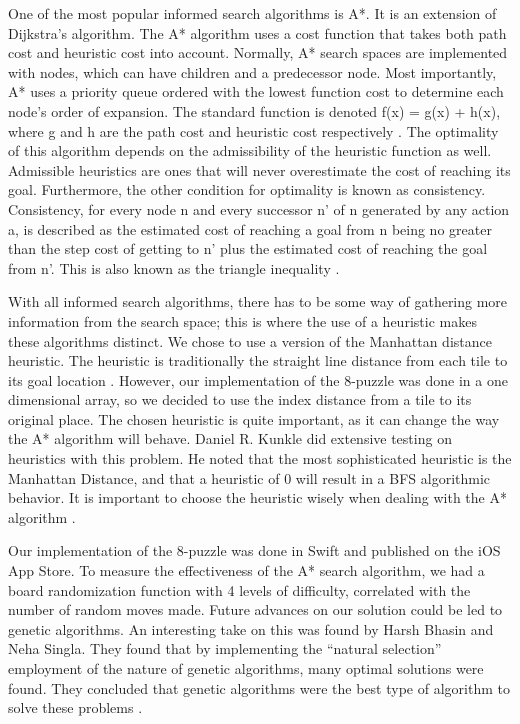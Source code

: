 \documentclass{article}
\begin{document}
One of the most popular informed search algorithms is A*. It is an extension of Dijkstra's algorithm. The A* algorithm uses a cost function that takes both path cost and heuristic cost into account. Normally, A* search spaces are implemented with nodes, which can have children and a predecessor node. Most importantly, A* uses a priority queue ordered with the lowest function cost to determine each node's order of expansion. The standard function is denoted f(x) = g(x) + h(x), where g and h are the path cost and heuristic cost respectively \cite{nosrati2012investigation}. The optimality of this algorithm depends on the admissibility of the heuristic function as well. Admissible heuristics are ones that will never overestimate the cost of reaching its goal. Furthermore, the other condition for optimality is known as consistency. Consistency, for every node n and every successor n’ of n generated by any action a,  is described as the estimated cost of reaching a goal from n being no greater than the step cost of getting to n’ plus the estimated cost of reaching the goal from n’. This is also known as the triangle inequality \cite{russell2002artificial}.

With all informed search algorithms, there has to be some way of gathering more information from the search space; this is where the use of a heuristic makes these algorithms distinct. We chose to use a version of the Manhattan distance heuristic. The heuristic is traditionally the straight line distance from each tile to its goal location \cite{burns2012implementing}. However, our implementation of the 8-puzzle was done in a one dimensional array, so we decided to use the index distance from a tile to its original place. The chosen heuristic is quite important, as it can change the way the A* algorithm will behave. Daniel R. Kunkle did extensive testing on heuristics with this problem. He noted that the most sophisticated heuristic is the Manhattan Distance, and that a heuristic of 0 will result in a BFS algorithmic behavior. It is important to choose the heuristic wisely when dealing with the A* algorithm \cite{kunkle2001solving}.

Our implementation of the 8-puzzle was done in Swift and published on the iOS App Store. To measure the effectiveness of the A* search algorithm, we had a board randomization function with 4 levels of difficulty, correlated with the number of random moves made. Future advances on our solution could be led to genetic algorithms. An interesting take on this was found by Harsh Bhasin and Neha Singla. They found that by implementing the “natural selection” employment of the nature of genetic algorithms, many optimal solutions were found. They concluded that genetic algorithms were the best type of algorithm to solve these problems \cite{bhasin2012genetic}.



\end{document}
